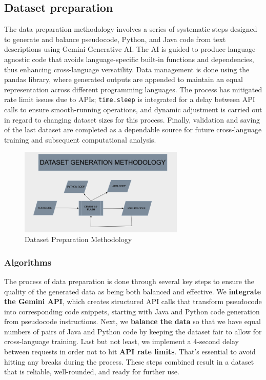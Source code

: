 \documentclass{dhbenelux}
\begin{document}
\subsection{Dataset preparation}
The data preparation methodology involves a series of systematic steps designed to generate and balance pseudocode, Python, and Java code from text descriptions using Gemini Generative AI. The AI is guided to produce language-agnostic code that avoids language-specific built-in functions and dependencies, thus enhancing cross-language versatility. Data management is done using the pandas library, where generated outputs are appended to maintain an equal representation across different programming languages. The process has mitigated rate limit issues due to APIs; \texttt{time.sleep} is integrated for a delay between API calls to ensure smooth-running operations, and dynamic adjustment is carried out in regard to changing dataset sizes for this process. Finally, validation and saving of the last dataset are completed as a dependable source for future cross-language training and subsequent computational analysis.

\begin{figure}[h!]
\centering
\includegraphics[width=0.7\textwidth]{dataset_methodology.png} %
\caption{Dataset Preparation Methodology}
\label{fig:dataset-methodology}
\end{figure}

\subsubsection{Algorithms}

The process of data preparation is done through several key steps to ensure the quality of the generated data as being both balanced and effective. We \textbf{integrate the Gemini API}, which creates structured API calls that transform pseudocode into corresponding code snippets, starting with Java and Python code generation from pseudocode instructions. Next, we \textbf{balance the data} so that we have equal numbers of pairs of Java and Python code by keeping the dataset fair to allow for cross-language training. Last but not least, we implement a 4-second delay between requests in order not to hit \textbf{API rate limits}. That's essential to avoid hitting any breaks during the process. These steps combined result in a dataset that is reliable, well-rounded, and ready for further use.
\end{document}
